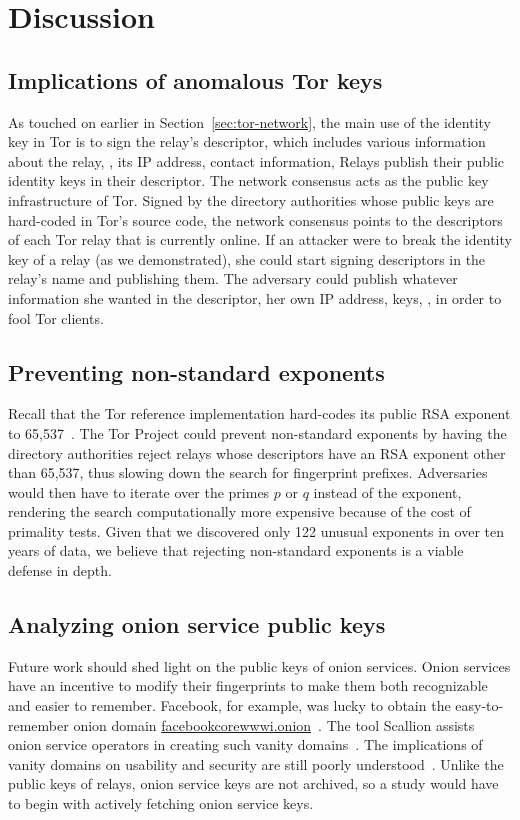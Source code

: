 \section{Discussion}
\label{sec:discussion}
\subsection{Implications of anomalous Tor keys}
As touched on earlier in Section~\ref{sec:tor-network}, the main use of the
identity key in Tor is to sign the relay's descriptor, which includes various
information about the relay, \eg, its IP address, contact information, \etc
Relays publish their public identity keys in their descriptor.  The network
consensus acts as the public key infrastructure of Tor.  Signed by the directory
authorities whose public keys are hard-coded in Tor's source code, the network
consensus points to the descriptors of each Tor relay that is currently online.
If an attacker were to break the identity key of a relay (as we demonstrated),
she could start signing descriptors in the relay's name and publishing them. The
adversary could publish whatever information she wanted in the descriptor, \eg
her own IP address, keys, \etc, in order to fool Tor clients.

\subsection{Preventing non-standard exponents}
Recall that the Tor reference implementation hard-codes its public RSA exponent
to 65,537~\cite[\S~0.3]{torspec}.  The Tor Project could prevent non-standard
exponents by having the directory authorities reject relays whose descriptors
have an RSA exponent other than 65,537, thus slowing down the search for
fingerprint prefixes.  Adversaries would then have to iterate over the primes
$p$ or $q$ instead of the exponent, rendering the search computationally
more expensive because of the cost of primality tests.  Given that we discovered
only 122 unusual exponents in over ten years of data, we believe that rejecting
non-standard exponents is a viable defense in depth.

\subsection{Analyzing onion service public keys}
Future work should shed light on the public keys of onion services.  Onion
services have an incentive to modify their fingerprints to make them both
recognizable and easier to remember.  Facebook, for example, was lucky to
obtain the easy-to-remember onion domain
\url{facebookcorewwwi.onion}~\cite{facebook}.  The tool Scallion assists onion
service operators in creating such vanity domains~\cite{scallion}.  The
implications of vanity domains on usability and security are still poorly
understood~\cite{vanity-domains}.  Unlike the public keys of relays, onion
service keys are not archived, so a study would have to begin with actively
fetching onion service keys.

